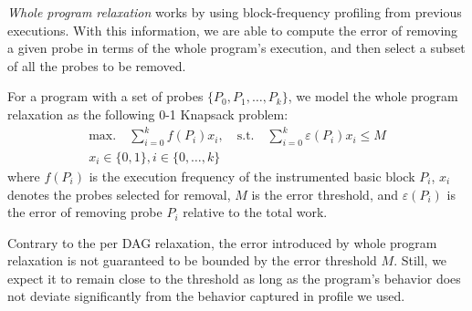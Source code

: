 \textit{Whole program relaxation} works by using block-frequency profiling from previous executions. With this information, we are able to
compute the error of removing a given probe in terms of the whole program's execution, and then select a subset of all the probes to be
removed.

For a program with a set of probes $\{P_0, P_1, \ldots, P_k\}$, we model the whole program relaxation as the following 0-1 Knapsack
problem:
\begin{gather*}
\textrm{max.}\quad\sum_{i=0}^{k} f(P_i)x_i,\quad
\textrm{s.t.}\quad\sum_{i=0}^{k} \varepsilon(P_i)x_i \leq M \\
x_i\in\{0,1\}, i\in\{0,\ldots,k\}
\end{gather*}
where $f(P_i)$ is the execution frequency of the instrumented basic block $P_i$, $x_i$ denotes the probes selected for removal, $M$ is the
error threshold, and $\varepsilon(P_i)$ is the error of removing probe $P_i$ relative to the total work.

Contrary to the per DAG relaxation, the error introduced by whole program relaxation is not guaranteed to be bounded by the error threshold
$M$. Still, we expect it to remain close to the threshold as long as the program's behavior does not deviate significantly from the
behavior captured in profile we used.
